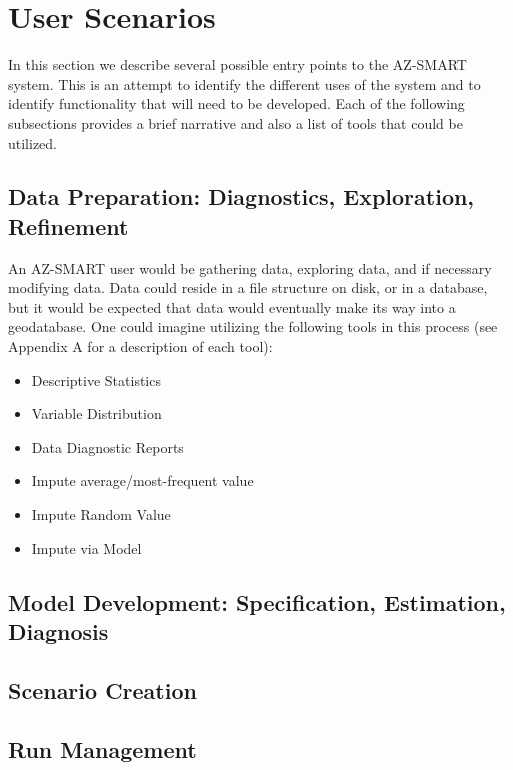 \section{User Scenarios}

In this section we describe several possible entry points to the AZ-SMART system. This is an attempt to identify the different uses of the system and to identify functionality that will need to be developed.  Each of the following subsections provides a brief narrative and also a list of tools that could be utilized.

\subsection{Data Preparation: Diagnostics, Exploration, Refinement}

An AZ-SMART user would be gathering data, exploring data, and if necessary modifying data.  Data could reside in a file structure on disk, or in a database, but it would be expected that data would eventually make its way into a geodatabase.  One could imagine utilizing the following tools in this process (see Appendix A for a description of each tool):

\begin{itemize}
	\item Descriptive Statistics
	\item Variable Distribution
	\item Data Diagnostic Reports
	\item Impute average/most-frequent value
	\item Impute Random Value
	\item Impute via Model
\end{itemize}

\subsection{Model Development: Specification, Estimation, Diagnosis}



\subsection{Scenario Creation}



\subsection{Run Management}



